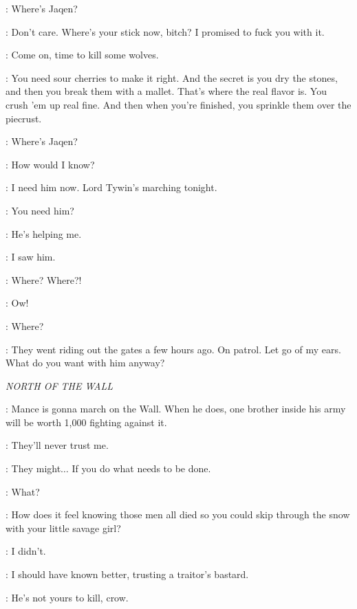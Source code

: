 \ARYA: Where's Jaqen? 

\BITER: Don't care. Where's your stick now, bitch? I promised to fuck you with it. 

\GUARD:  Come on, time to kill some wolves. 


\HOTPIE: You need sour cherries to make it right. And the secret is you dry the stones, and then you break them with a mallet. That's where the real flavor is. You crush 'em up real fine. And then when you're finished, you sprinkle them over the piecrust. 

\ARYA: Where's Jaqen? 

\GENDRY: How would I know? 

\ARYA: I need him now. Lord Tywin's marching tonight. 

\GENDRY: You need him? 

\ARYA: He's helping me. 

\HOTPIE: I saw him. 

\ARYA: Where? Where?! 


\HOTPIE: Ow! 

\ARYA: Where? 

\HOTPIE: They went riding out the gates a few hours ago. On patrol. Let go of my ears. What do you want with him anyway? 


\scene

\textit{NORTH OF THE WALL} 


\HALFHAND: Mance is gonna march on the Wall. When he does, one brother inside his army will be worth 1,000 fighting against it. 

\JON: They'll never trust me. 

\HALFHAND: They might$\ldots$ If you do what needs to be done. 

\JON: What? 

\HALFHAND: How does it feel knowing those men all died so you could skip through the snow with your little savage girl? 

\JON: I didn't. 

\HALFHAND: I should have known better, trusting a traitor's bastard. 

\LORDOFBONES: He's not yours to kill, crow. 

